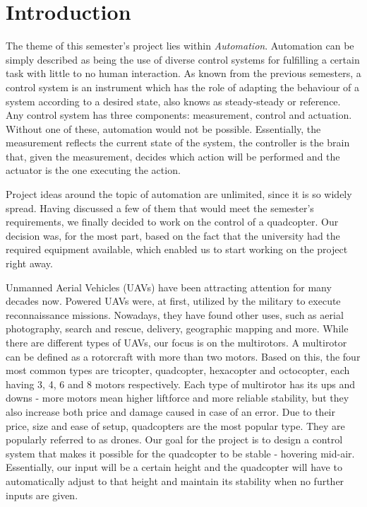 \section{Introduction}

The theme of this semester's project lies within \textit{Automation}. Automation can be simply described as being the use of diverse control systems for fulfilling a certain task with little to no human interaction. As known from the previous semesters, a control system is an instrument which has the role of adapting the behaviour of a system according to a desired state, also knows as steady-steady or reference. Any control system has three components: measurement, control and actuation. Without one of these, automation would not be possible. Essentially, the measurement reflects the current state of the system, the controller is the brain that, given the measurement, decides which action will be performed and the actuator is the one executing the action. 

Project ideas around the topic of automation are unlimited, since it is so widely spread. Having discussed a few of them that would meet the semester's requirements, we finally decided to work on the control of a quadcopter. Our decision was, for the most part, based on the fact that the university had the required equipment available, which enabled us to start working on the project right away. 

Unmanned Aerial Vehicles (UAVs) have been attracting attention for many decades now. Powered UAVs were, at first, utilized by the military to execute reconnaissance missions. Nowadays, they have found other uses, such as aerial photography, search and rescue, delivery, geographic mapping and more. While there are different types of UAVs, our focus is on the multirotors. A multirotor can be defined as a rotorcraft with more than two motors. Based on this, the four most common types are tricopter, quadcopter, hexacopter and octocopter, each having 3, 4, 6 and 8 motors respectively. Each type of multirotor has its ups and downs - more motors mean higher liftforce and more reliable stability, but they also increase both price and damage caused in case of an error. Due to their price, size and ease of setup, quadcopters are the most popular type. They are popularly referred to as drones. Our goal for the project is to design a control system that makes it possible for the quadcopter to be stable - hovering mid-air. Essentially, our input will be a certain height and the quadcopter will have to automatically adjust to that height and maintain its stability when no further inputs are given. 
